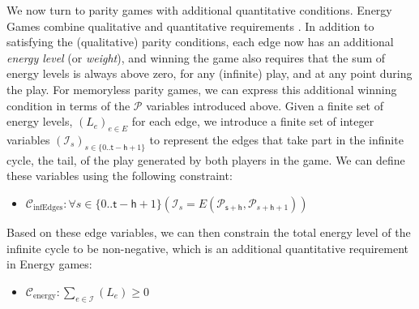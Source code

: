 \documentclass[a4paper,UKenglish,cleveref, autoref, thm-restate, anonymous]{lipics-v2021}
\begin{document}
We now turn to parity games with additional quantitative conditions. Energy Games combine qualitative and quantitative requirements \cite{Chatterjee:2010}. In addition to satisfying the (qualitative) parity conditions, each edge now has an additional \textit{energy level} (or \textit{weight}), and winning the game also requires that the sum of energy levels is always above zero, for any (infinite) play, and at any point during the play.
%
%
%
For memoryless parity games, we can express this additional winning condition in terms of the $\mathcal{P}$ variables introduced above. 
%
Given a finite set of energy levels, $(L_e)_{e \in E}$ for each edge, we introduce a finite set of integer variables $(\mathcal{I}_s)_{s \in \{0..\mathsf{t} -\mathsf{h}+1\}}$ to represent the edges that take part in the infinite cycle, the tail, of the play generated by both players in the game. We can define these variables using the following constraint:
\begin{itemize}
    \item $\mathcal{C}_{\text{infEdges}} : \forall s \in \{0..\mathsf{t} -\mathsf{h}+1\} (\mathcal{I}_s = E(\mathcal{P}_{\mathsf{s}+\mathsf{h}},\mathcal{P}_{s+\mathsf{h}+1}) )$
\end{itemize}

Based on these edge variables, we can then constrain the total energy level of the infinite cycle to be non-negative, which is an additional quantitative requirement in Energy games:


\begin{itemize}
    \item $\mathcal{C}_{\text{energy}} : \sum_{e \in \mathcal{I}} (L_e) \geq 0$
\end{itemize}
\end{document}
